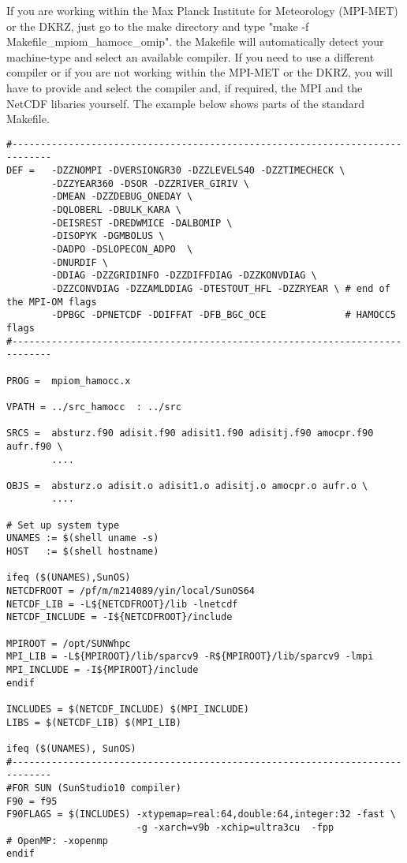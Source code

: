 \documentclass[11pt,a4paper,fleqn,twoside]{article}
\begin{document}
If you are working within the Max Planck Institute for Meteorology (MPI-MET) or the DKRZ,
just go to the make directory and type "make -f Makefile\_mpiom\_hamocc\_omip". the Makefile will 
automatically detect your machine-type and select an available compiler.
If you need to use a different compiler or if you are not working within the MPI-MET or the DKRZ,
you will have to provide and select the compiler and, if required, the MPI and the NetCDF libaries yourself.
The example below shows parts of the standard Makefile. 

\begin{footnotesize}
\begin{verbatim}
#-----------------------------------------------------------------------------
DEF =   -DZZNOMPI -DVERSIONGR30 -DZZLEVELS40 -DZZTIMECHECK \
        -DZZYEAR360 -DSOR -DZZRIVER_GIRIV \
        -DMEAN -DZZDEBUG_ONEDAY \
        -DQLOBERL -DBULK_KARA \
        -DEISREST -DREDWMICE -DALBOMIP \
        -DISOPYK -DGMBOLUS \
        -DADPO -DSLOPECON_ADPO  \
        -DNURDIF \
        -DDIAG -DZZGRIDINFO -DZZDIFFDIAG -DZZKONVDIAG \
        -DZZCONVDIAG -DZZAMLDDIAG -DTESTOUT_HFL -DZZRYEAR \ # end of the MPI-OM flags
        -DPBGC -DPNETCDF -DDIFFAT -DFB_BGC_OCE              # HAMOCC5 flags
#-----------------------------------------------------------------------------

PROG =	mpiom_hamocc.x

VPATH = ../src_hamocc  : ../src

SRCS =	absturz.f90 adisit.f90 adisit1.f90 adisitj.f90 amocpr.f90 aufr.f90 \
        ....

OBJS =	absturz.o adisit.o adisit1.o adisitj.o amocpr.o aufr.o \
        ....

# Set up system type
UNAMES := $(shell uname -s)
HOST   := $(shell hostname)

ifeq ($(UNAMES),SunOS)
NETCDFROOT = /pf/m/m214089/yin/local/SunOS64
NETCDF_LIB = -L${NETCDFROOT}/lib -lnetcdf
NETCDF_INCLUDE = -I${NETCDFROOT}/include

MPIROOT = /opt/SUNWhpc
MPI_LIB = -L${MPIROOT}/lib/sparcv9 -R${MPIROOT}/lib/sparcv9 -lmpi
MPI_INCLUDE = -I${MPIROOT}/include
endif

INCLUDES = $(NETCDF_INCLUDE) $(MPI_INCLUDE)
LIBS = $(NETCDF_LIB) $(MPI_LIB)

ifeq ($(UNAMES), SunOS)
#-----------------------------------------------------------------------------
#FOR SUN (SunStudio10 compiler)
F90 = f95
F90FLAGS = $(INCLUDES) -xtypemap=real:64,double:64,integer:32 -fast \
                       -g -xarch=v9b -xchip=ultra3cu  -fpp 
# OpenMP: -xopenmp
endif


\end{verbatim}
\end{footnotesize}
\end{document}
